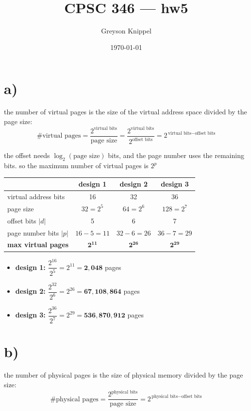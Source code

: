 \documentclass[11pt]{article}
\title{CPSC 346 --- hw5}
\author{Greyson Knippel}
\date{\today}
\begin{document}
\maketitle


\section*{a)}

the number of virtual pages is the size of the virtual address space divided by the page size:
\[
\#\text{virtual pages} = \frac{2^{\text{virtual bits}}}{\text{page size}}
= \frac{2^{\text{virtual bits}}}{2^{\text{offset bits}}}
= 2^{\,\text{virtual bits} - \text{offset bits}}
\]

the offset needs $\log_2(\text{page size})$ bits, and the page number uses the remaining bits.
so the maximum number of virtual pages is $2^{p}$

\begin{center}
\renewcommand{\arraystretch}{1.3}
\begin{tabular}{lccc}
\toprule
 & design 1 & design 2 & design 3 \\
\midrule
virtual address bits & 16 & 32 & 36 \\
page size & $32 = 2^5$ & $64 = 2^6$ & $128 = 2^7$ \\
offset bits $|d|$ & 5 & 6 & 7 \\
page number bits $|p|$ & $16-5=11$ & $32-6=26$ & $36-7=29$ \\
\midrule
\textbf{max virtual pages} & $\mathbf{2^{11}}$ & $\mathbf{2^{26}}$ & $\mathbf{2^{29}}$ \\
\bottomrule
\end{tabular}
\end{center}

\begin{itemize}
  \item \textbf{design 1:} $\dfrac{2^{16}}{2^{5}} = 2^{11} = \mathbf{2{,}048}$ pages
  \item \textbf{design 2:} $\dfrac{2^{32}}{2^{6}} = 2^{26} = \mathbf{67{,}108{,}864}$ pages
  \item \textbf{design 3:} $\dfrac{2^{36}}{2^{7}} = 2^{29} = \mathbf{536{,}870{,}912}$ pages
\end{itemize}


\section*{b)}

the number of physical pages is the size of physical memory divided by the page size:
\[
\#\text{physical pages} = \frac{2^{\text{physical bits}}}{\text{page size}}
= 2^{\,\text{physical bits} - \text{offset bits}}
\]
\end{document}
